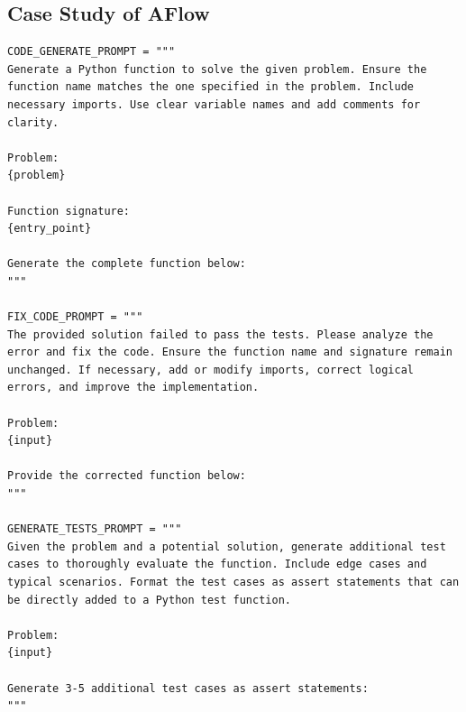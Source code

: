 \documentclass{article} %
\newcommand{\model}{{\sc AFlow}\xspace}
\theoremstyle{plain}
\theoremstyle{definition}
\theoremstyle{remark}
\begin{document}
\subsection{Case Study of \model}
\begin{tcolorbox}[title={\textbf{\small Alpha Codium like workflow for MBPP}}, boxrule=1pt, arc=0mm, colback=black!5!white, colframe=black!75!white, breakable, before skip=10pt, after skip=10pt, pad at break=2mm, parbox=false] \begin{verbatim}
CODE_GENERATE_PROMPT = """
Generate a Python function to solve the given problem. Ensure the function name matches the one specified in the problem. Include necessary imports. Use clear variable names and add comments for clarity.

Problem:
{problem}

Function signature:
{entry_point}

Generate the complete function below:
"""

FIX_CODE_PROMPT = """
The provided solution failed to pass the tests. Please analyze the error and fix the code. Ensure the function name and signature remain unchanged. If necessary, add or modify imports, correct logical errors, and improve the implementation.

Problem:
{input}

Provide the corrected function below:
"""

GENERATE_TESTS_PROMPT = """
Given the problem and a potential solution, generate additional test cases to thoroughly evaluate the function. Include edge cases and typical scenarios. Format the test cases as assert statements that can be directly added to a Python test function.

Problem:
{input}

Generate 3-5 additional test cases as assert statements:
"""


\end{verbatim}
\end{tcolorbox}
\end{document}
